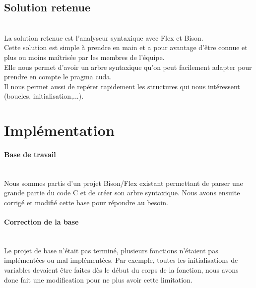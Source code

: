 \documentclass{article}
\begin{document}
	
	\subsection{Solution retenue}
	~~\\
	\indent
	La solution retenue est l'analyseur syntaxique avec Flex et Bison. \\Cette solution est simple à prendre en main et a pour avantage d'être connue et plus ou moins maîtrisée par les membres de l'équipe. \\Elle nous permet d'avoir un arbre syntaxique qu'on peut facilement adapter pour prendre en compte le pragma cuda. \\Il nous permet aussi de repérer rapidement les structures qui nous intéressent (boucles, initialisation,...).

	
	\newpage
	
	
	
	
	\section{Implémentation}
	
	\paragraph{Base de travail}
	~~\\
	\indent
	Nous sommes partis d'un projet Bison/Flex existant permettant de parser une grande partie du code C et de créer son arbre syntaxique. Nous avons ensuite corrigé et modifié cette base pour répondre au besoin.
	
	\paragraph{Correction de la base}
	~~\\
	\indent
	Le projet de base n'était pas terminé, plusieurs fonctions n'étaient pas implémentées ou mal implémentées. Par exemple, toutes les initialisations de variables devaient être faites dès le début du corps de la fonction, nous avons donc fait une modification pour ne plus avoir cette limitation.
	
\end{document}

